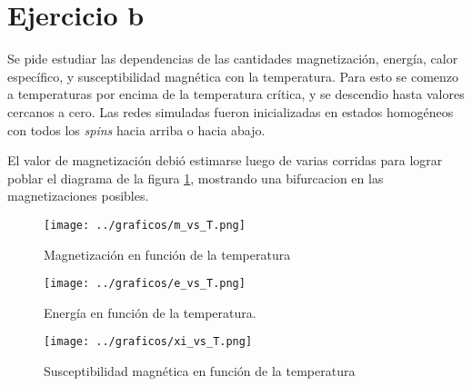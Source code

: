 \documentclass[a4paper,10pt]{paper}
\begin{document}
\section{Ejercicio b}
Se pide estudiar las dependencias de las cantidades magnetizaci\'on, energ\'ia, calor espec\'ifico, y
susceptibilidad magn\'etica con la temperatura. Para esto se comenzo a temperaturas por encima de la
temperatura cr\'itica, y se descendio hasta valores cercanos a cero.
Las redes simuladas fueron inicializadas en estados homog\'eneos con todos los \textit{spins} hacia arriba
o hacia abajo.

El valor de magnetizaci\'on debi\'o estimarse luego de varias corridas para lograr poblar el diagrama de la 
figura \ref{fig:m_vs_T}, mostrando una bifurcacion en las magnetizaciones posibles.


\begin{figure}
\centering
 \texttt{[image: ../graficos/m\_vs\_T.png]}
 \caption{Magnetizaci\'on en funci\'on de la temperatura}
 \label{fig:m_vs_T}
\end{figure}


\begin{figure}
 \centering
 \texttt{[image: ../graficos/e\_vs\_T.png]}
 \caption{Energ\'ia en funci\'on de la temperatura.}
 \label{fig:e_vs_T}
\end{figure}

\begin{figure}
 \centering
 \texttt{[image: ../graficos/xi\_vs\_T.png]}
 \caption{Susceptibilidad magn\'etica en funci\'on de la temperatura}
 \label{fig:xi_vs_T}
\end{figure}
\end{document}
